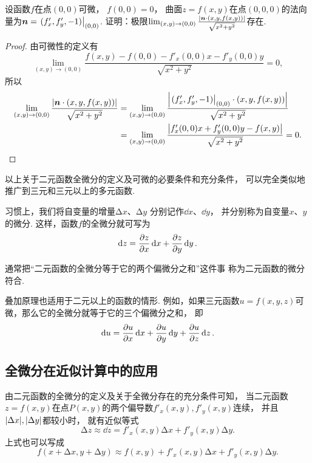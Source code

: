 \begin{example}
设函数\(f\)在点\((0,0)\)可微，
\(f(0,0) = 0\)，
曲面\(z = f(x,y)\)在点\((0,0,0)\)的法向量为\(\vb{n} = \eval{(f'_x,f'_y,-1)}_{(0,0)}\).
证明：极限\begin{math}
	\lim_{(x,y)\to(0,0)} \frac{\abs{\boldsymbol{n} \cdot (x,y,f(x,y))}}{\sqrt{x^2+y^2}}
\end{math}存在.
\begin{proof}
由可微性的定义有\begin{equation*}
	\lim_{(x,y)\to(0,0)} \frac{
		f(x,y) - f(0,0)
		- f'_x(0,0) x
		- f'_y(0,0) y
	}{
		\sqrt{x^2+y^2}
	}
	= 0,
\end{equation*}
所以\begin{align*}
	\lim_{(x,y)\to(0,0)} \frac{\abs{\vb{n} \cdot (x,y,f(x,y))}}{\sqrt{x^2+y^2}}
	&= \lim_{(x,y)\to(0,0)} \frac{
		\abs{
			\eval{(f'_x,f'_y,-1)}_{(0,0)}
			\cdot
			(x,y,f(x,y))
		}
	}{
		\sqrt{x^2+y^2}
	} \\
	&= \lim_{(x,y)\to(0,0)} \frac{
		\abs{
			f'_x(0,0) x + f'_y(0,0) y - f(x,y)
		}
	}{
		\sqrt{x^2+y^2}
	}
	= 0.
	\qedhere
\end{align*}
\end{proof}
\end{example}

以上关于二元函数全微分的定义及可微的必要条件和充分条件，
可以完全类似地推广到三元和三元以上的多元函数.

习惯上，我们将自变量的增量\(\increment x\)、\(\increment y\)
分别记作\(\dd{x}\)、\(\dd{y}\)，
并分别称为自变量\(x\)、\(y\)的微分.
这样，函数\(f\)的全微分就可写为\[
	\dd{z}=\pdv{z}{x}\dd{x}+\pdv{z}{y}\dd{y}.
\]

通常把“二元函数的全微分等于它的两个偏微分之和”这件事
称为二元函数的微分符合.

叠加原理也适用于二元以上的函数的情形.
例如，如果三元函数\(u = f(x,y,z)\)可微，那么它的全微分就等于它的三个偏微分之和，
即\[
	\dd{u} = \pdv{u}{x} \dd{x} + \pdv{u}{y} \dd{y} + \pdv{u}{z} \dd{z}.
\]

\subsection{全微分在近似计算中的应用}
由二元函数的全微分的定义及关于全微分存在的充分条件可知，
当二元函数\(z = f(x,y)\)在点\(P(x,y)\)的两个偏导数\(f'_x(x,y),f'_y(x,y)\)连续，
并且\(\abs{\Delta x},\abs{\Delta y}\)都较小时，
就有近似等式\[
	\increment z \approx \dd{z} = f'_x(x,y) \increment x + f'_y(x,y) \increment y.
\]
上式也可以写成\[
	f(x+\increment x,y+\increment y) \approx f(x,y) + f'_x(x,y) \increment x + f'_y(x,y) \increment y.
\]


